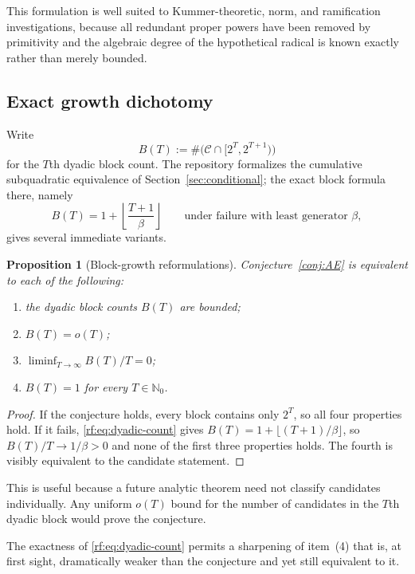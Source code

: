 \documentclass[11pt,oneside]{article}
\newtheorem{proposition}[theorem]{Proposition}
\theoremstyle{definition}
\theoremstyle{remark}
\newcommand{\Nzero}{\mathbb N_0}
\newcommand{\Cand}{\mathcal C}
\begin{document}
This formulation is well suited to Kummer-theoretic, norm, and ramification investigations,
because all redundant proper powers have been removed by primitivity and the algebraic degree
of the hypothetical radical is known exactly rather than merely bounded.

\subsection{Exact growth dichotomy}

Write
\[
 B(T):=\#\bigl(\Cand\cap[2^T,2^{T+1})\bigr)
\]
for the $T$th dyadic block count.  The repository formalizes the cumulative subquadratic
equivalence of Section~\ref{sec:conditional}; the exact block formula there, namely
\begin{equation}
 B(T)=1+\left\lfloor\frac{T+1}{\beta}\right\rfloor
 \qquad\text{under failure with least generator }\beta,
 \label{rf:eq:dyadic-count}
\end{equation}
gives several immediate variants.

\begin{proposition}[Block-growth reformulations]
\label{rf:prop:block-reforms}
Conjecture~\ref{conj:AE} is equivalent to each of the following:
\begin{enumerate}
\item the dyadic block counts $B(T)$ are bounded;
\item $B(T)=o(T)$;
\item $\displaystyle\liminf_{T\to\infty}B(T)/T=0$;
\item $B(T)=1$ for every $T\in\Nzero$.
\end{enumerate}
\end{proposition}

\begin{proof}
If the conjecture holds, every block contains only $2^T$, so all four properties hold.  If it
fails, \eqref{rf:eq:dyadic-count} gives $B(T)=1+\lfloor(T+1)/\beta\rfloor$, so
$B(T)/T\to1/\beta>0$ and none of the first three properties holds.  The fourth is visibly
equivalent to the candidate statement.
\end{proof}

This is useful because a future analytic theorem need not classify candidates individually.
Any uniform $o(T)$ bound for the number of candidates in the $T$th dyadic block would prove
the conjecture.

The exactness of \eqref{rf:eq:dyadic-count} permits a sharpening of item~(4) that is, at first
sight, dramatically weaker than the conjecture and yet still equivalent to it.
\end{document}

